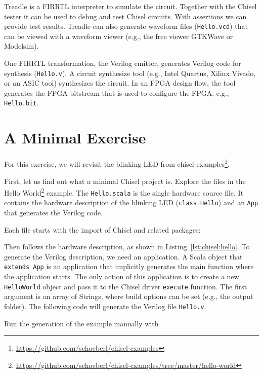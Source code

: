 \documentclass[%
    10pt,
    headinclude, footexclude,
    openright, %
    notitlepage,
    cleardoubleempty,
    headsepline,
    pointlessnumbers,
    bibtotoc, idxtotoc,
    ]{scrbook}
\newcommand{\code}[1]{{\small{\texttt{#1}}}}
\newcommand{\myref}[2]{\href{#1}{#2}}
\renewcommand{\myref}[2]{{#2}{\footnote{\url{#1}}}}
\begin{document}
Treadle is a FIRRTL interpreter to simulate the circuit. Together with the Chisel tester it can be
used to debug and test Chisel circuits. With assertions we can provide test results.
Treadle can also generate waveform files (\code{Hello.vcd}) that can be viewed with
a waveform viewer (e.g., the free viewer GTKWave or Modelsim).

One FIRRTL transformation, the Verilog emitter, generates Verilog code for synthesis (\code{Hello.v}).
A circuit synthesize tool (e.g., Intel Quartus, Xilinx Vivado, or an ASIC tool) synthesizes the circuit.
In an FPGA design flow, the tool generates the FPGA bitstream that is used to configure the FPGA,
e.g., \code{Hello.bit}.

\section{A Minimal Exercise}

For this exercise, we will revisit the blinking LED from
\myref{https://github.com/schoeberl/chisel-examples}{chisel-examples}.

First, let us find out what a minimal Chisel project is. Explore the files in the
\myref{https://github.com/schoeberl/chisel-examples/tree/master/hello-world}{Hello World}
example.
The \code{Hello.scala} is the single hardware source file.
It contains the hardware description of the blinking LED (\code{class Hello})
and an \code{App} that generates the Verilog code.

Each file starts with the import of Chisel and related packages:


\noindent Then follows the hardware description, as shown in Listing~\ref{lst:chisel:hello}.
To generate the Verilog description, we need an application. A Scala object that \code{extends App}
is an application that implicitly generates the main function where the application starts.
The only action of this application is to create a new \code{HelloWorld} object and pass it
to the Chisel driver \code{execute} function. The first argument is an array of Strings,
where build options can be set (e.g., the output folder). The following code will
generate the Verilog file \code{Hello.v}.


\noindent Run the generation of the example manually with

\end{document}
